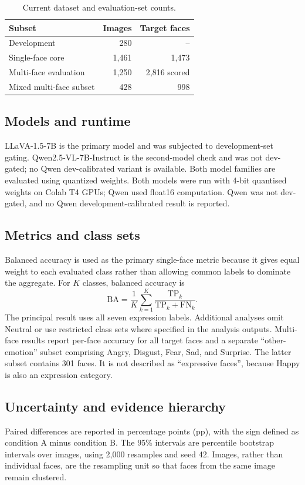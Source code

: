 \documentclass[lettersize,journal]{IEEEtran}
\begin{document}
\begin{table}[!t]
\caption{Current dataset and evaluation-set counts.}
\label{tab:dataset}
\centering
\footnotesize
\begin{tabular}{lrr}
\toprule
Subset & Images & Target faces \\
\midrule
Development & 280 & -- \\
Single-face core & 1,461 & 1,473 \\
Multi-face evaluation & 1,250 & 2,816 scored \\
Mixed multi-face subset & 428 & 998 \\
\bottomrule
\end{tabular}
\end{table}

\subsection{Models and runtime}
LLaVA-1.5-7B is the primary model and was subjected to development-set gating. Qwen2.5-VL-7B-Instruct is the second-model check and was not dev-gated; no Qwen dev-calibrated variant is available. Both model families are evaluated using quantized weights. Both models were run with 4-bit quantised weights on Colab T4 GPUs; Qwen used float16 computation. Qwen was not dev-gated, and no Qwen development-calibrated result is reported.

\subsection{Metrics and class sets}
Balanced accuracy is used as the primary single-face metric because it gives equal weight to each evaluated class rather than allowing common labels to dominate the aggregate. For $K$ classes, balanced accuracy is
\begin{equation}
\mathrm{BA} = \frac{1}{K}\sum_{k=1}^{K}\frac{\mathrm{TP}_k}{\mathrm{TP}_k+\mathrm{FN}_k}.
\end{equation}
The principal result uses all seven expression labels. Additional analyses omit Neutral or use restricted class sets where specified in the analysis outputs. Multi-face results report per-face accuracy for all target faces and a separate ``other-emotion'' subset comprising Angry, Disgust, Fear, Sad, and Surprise. The latter subset contains 301 faces. It is not described as ``expressive faces'', because Happy is also an expression category.

\subsection{Uncertainty and evidence hierarchy}
Paired differences are reported in percentage points (pp), with the sign defined as condition A minus condition B. The 95\% intervals are percentile bootstrap intervals over images, using 2,000 resamples and seed 42. Images, rather than individual faces, are the resampling unit so that faces from the same image remain clustered.
\end{document}
